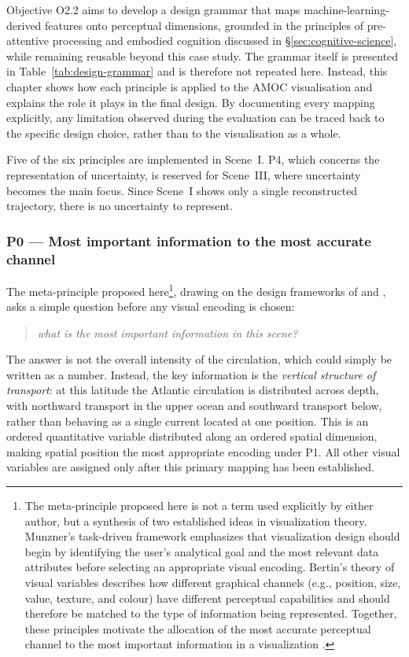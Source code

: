 Objective O2.2 aims to develop a design grammar that maps machine-learning-derived features onto perceptual dimensions, grounded in the principles of pre-attentive processing and embodied cognition discussed in \S\ref{sec:cognitive-science}, while remaining reusable beyond this case study. The grammar itself is presented in Table~\ref{tab:design-grammar} and is therefore not repeated here. Instead, this chapter shows how each principle is applied to the AMOC visualisation and explains the role it plays in the final design. By documenting every mapping explicitly, any limitation observed during the evaluation can be traced back to the specific design choice, rather than to the visualisation as a whole.

Five of the six principles are implemented in Scene~I. P4, which concerns the representation of uncertainty, is reserved for Scene~III, where uncertainty becomes the main focus. Since Scene~I shows only a single reconstructed trajectory, there is no uncertainty to represent.

\subsubsection*{P0 --- Most important information to the most accurate channel}

The meta-principle proposed here\footnote{The meta-principle proposed here is not a term used explicitly by either author, but a synthesis of two established ideas in visualization theory. Munzner's task-driven framework emphasizes that visualization design should begin by identifying the user's analytical goal and the most relevant data attributes before selecting an appropriate visual encoding. Bertin's theory of visual variables describes how different graphical channels (e.g., position, size, value, texture, and colour) have different perceptual capabilities and should therefore be matched to the type of information being represented. Together, these principles motivate the allocation of the most accurate perceptual channel to the most important information in a visualization \parencite{munzner2014,bertin1983}.}, drawing on the design frameworks of \textcite{munzner2014} and \textcite{bertin1983}, asks a simple question before any visual encoding is chosen: 

\begin{quote}
\emph{what is the most important information in this scene? }
\end{quote}

The answer is not the overall intensity of the circulation, which could simply be written as a number. Instead, the key information is the \emph{vertical structure of transport}: at this latitude the Atlantic circulation is distributed across depth, with northward transport in the upper ocean and southward transport below, rather than behaving as a single current located at one position. This is an ordered quantitative variable distributed along an ordered spatial dimension, making spatial position the most appropriate encoding under P1. All other visual variables are assigned only after this primary mapping has been established.

